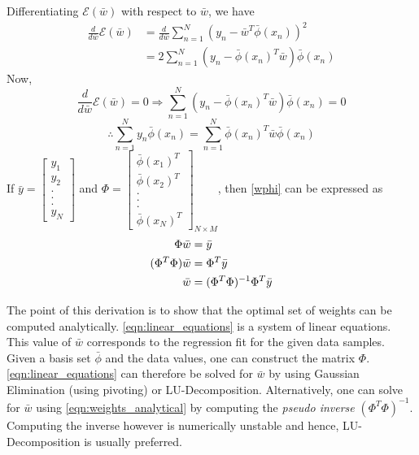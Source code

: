\documentclass[a4paper,12pt]{article}
\begin{document}
Differentiating $\mathcal{E}(\bar{w})$ with respect to $\bar{w}$, we have
\begin{align*}
 \frac{d}{d\bar{w}}\mathcal{E}(\bar{w}) &= \frac{d}{d\bar{w}}\sum_{n=1}^N (y_n-\bar{w}^T \bar{\phi}(x_n))^2 \\
					 &= 2 \sum_{n=1}^N (y_n- \bar{\phi}(x_n)^T\bar{w})\bar{\phi}(x_n) 
\end{align*}
Now,
\[ \frac{d}{d\bar{w}}\mathcal{E}(\bar{w}) = 0 \Rightarrow \sum_{n=1}^N (y_n - \bar{\phi}(x_n)^T\bar{w})\bar{\phi}(x_n) = 0 \]
\begin{equation}\label{eqn:wphi}
\therefore \sum_{n=1}^N y_n \bar{\phi}(x_n) = \sum_{n=1}^N \bar{\phi}(x_n)^T \bar{w} \bar{\phi}(x_n)
\end{equation}
If $
    \bar{y} = \left[ 
		      \begin{array}{c}
		       y_1 \\ y_2 \\ . \\ . \\ . \\ y_N
		      \end{array}
	      \right]
   $
 and $
      \Phi = \left[
		      \begin{array}{c}
		       \bar{\phi}(x_1)^T \\ \bar{\phi}(x_2)^T \\ . \\ . \\. \\ \bar{\phi}(x_N)^T
		      \end{array}
	     \right]_{N\times M} 
     $,
then \eqref{wphi} can be expressed as
\begin{align}
	 \Phi \bar{w} &= \bar{y} \notag \\
(\Phi^T \Phi) \bar{w} &= \Phi^T \bar{y} \label{eqn:linear_equations} \\
	      \bar{w} &= (\Phi^T \Phi)^{-1} \Phi^T \bar{y} \label{eqn:weights_analytical}
\end{align}

The point of this derivation is to show that the optimal set of weights can be computed analytically. \eqref{eqn:linear_equations} is a system of linear equations. This value of $\bar{w}$ corresponds to the regression fit for the given data samples. Given a basis set $\bar{\phi}$ and the data values, one can construct the matrix $\Phi$. \eqref{eqn:linear_equations} can therefore be solved for $\bar{w}$ by using Gaussian Elimination (using pivoting) or LU-Decomposition. Alternatively, one can solve for $\bar{w}$ using \eqref{eqn:weights_analytical} by computing the \textit{pseudo inverse} $(\Phi^T \Phi)^{-1}$. Computing the inverse however is numerically unstable and hence, LU-Decomposition is usually preferred. \\
\end{document}
